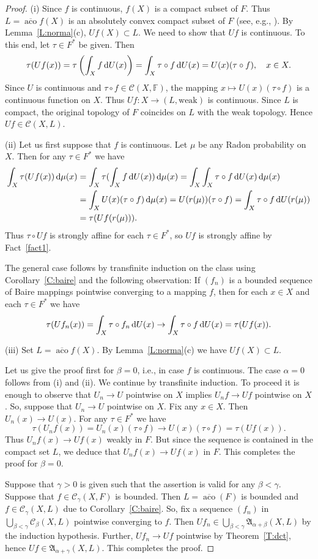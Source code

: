 \documentclass{amsart}
\numberwithin{equation}{section}
\theoremstyle{definition}
\def\fra{\mathfrak{A}}
\def\C{\mathcal C}
\def\aco{\operatorname{aco}}
\def\ef{\mathbb F}
\def\ov{\overline}
\def\di{\,\mbox{\rm d}}
\begin{document}
\begin{proof}
(i) Since $f$ is continuous, $f(X)$ is a compact subset of $F$. Thus $L=\ov{\aco} f(X)$ is an absolutely convex compact subset of $F$ (see, e.g., \cite[Proposition 6.7.2]{jarchow}). By Lemma~\ref{L:norma}(c), $Uf(X)\subset L$. We need to show that $Uf$ is continuous. To this end, let
$\tau\in F^*$ be given.
Then
\[
\tau(Uf(x))=\tau\left(\int_{X} f\di U(x)\right)=\int_{X} \tau\circ f\di U(x)=U(x)(\tau\circ f), \quad x\in X.
\]
Since $U$ is continuous and $\tau\circ f\in\C(X,\ef)$, the mapping $x\mapsto U(x)(\tau\circ f)$ is a continuous function on $X$. Thus $Uf\colon X\to (L,\text{weak})$ is continuous. Since $L$ is compact, the original topology of $F$ coincides on $L$ with the weak topology. Hence $Uf\in\C(X,L)$.

(ii) Let us first suppose that $f$ is continuous.
Let $\mu$ be any Radon probability on $X$. Then for any $\tau\in F^*$ we have
$$
\begin{aligned}
\int_X \tau(Uf(x))\di\mu(x)&=
\int_X \tau(\int_X f \di U(x))\di\mu(x)
=\int_X \int_X \tau\circ f \di U(x) \di\mu(x)
\\&=\int_X U(x)(\tau\circ f)\di\mu(x)
= U(r(\mu))(\tau\circ f)
=\int_X \tau\circ f\di U(r(\mu))
\\&=\tau(Uf(r(\mu))).\end{aligned}$$
Thus $\tau\circ Uf$ is strongly affine for each $\tau\in F^*$, so $Uf$ is strongly affine by Fact~\ref{fact1}.

The general case follows by transfinite induction on the class using Corollary~\ref{C:baire} and the following observation: If $(f_n)$ is a bounded sequence of Baire mappings pointwise converging to a mapping $f$, then for each $x\in X$ and each $\tau\in F^*$
we have
$$\tau(Uf_n(x))=\int_X \tau \circ f_n\di U(x)\to\int_X \tau \circ f\di U(x)=\tau(Uf(x)).$$

(iii) Set $L=\ov{\aco} f(X)$. By Lemma~\ref{L:norma}(c) we have $Uf(X)\subset L$.

Let us give the proof first for $\beta=0$, i.e., in case $f$ is continuous.
The case $\alpha=0$ follows from (i) and (ii). We continue by transfinite induction.
To proceed it is enough to observe that $U_n\to U$ pointwise on $X$ implies $U_nf\to Uf$ pointwise on $X$. So, suppose that $U_n\to U$ pointwise on $X$.
Fix any $x\in X$. Then $U_n(x)\to U(x)$. For any $\tau\in F^*$ we have
$$\tau(U_n f(x))=U_n(x)(\tau\circ f)\to U(x)(\tau\circ f)=\tau(Uf(x)).$$
Thus $U_nf(x)\to Uf(x)$ weakly in $F$. But since the sequence is contained in the compact set $L$, we deduce that $U_nf(x)\to Uf(x)$ in $F$. This completes the proof for $\beta=0$.

Suppose that $\gamma>0$ is given such that the assertion is valid for any $\beta<\gamma$. Suppose that $f\in\C_\gamma(X,F)$ is bounded. Then $L=\ov{\aco}(F)$ is bounded and $f\in\C_\gamma(X,L)$ due to Corollary~\ref{C:baire}. So, fix a sequence $(f_n)$ in $\bigcup_{\beta<\gamma} \C_\beta(X,L)$ pointwise converging to $f$. Then $Uf_n\in\bigcup_{\beta<\gamma} \fra_{\alpha+\beta}(X,L)$ by the induction hypothesis. Further, $Uf_n\to Uf$ pointwise by Theorem~\ref{T:dct}, hence $Uf\in\fra_{\alpha+\gamma}(X,L)$.
This completes the proof.
\end{proof}
\end{document}
